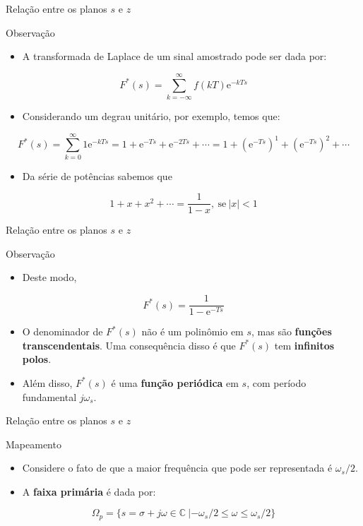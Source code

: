 \begin{frame}{Relação entre os planos $s$ e $z$}
\begin{block}{Observação}
\begin{itemize}
		\item A transformada de Laplace de um sinal amostrado pode ser dada por:
\end{itemize}
$$F^*(s) = \sum_{k=-\infty}^{\infty} f(kT) \text{e}^{-kTs}$$
\begin{itemize}
		\item Considerando um degrau unitário, por exemplo, temos que:
\end{itemize}
$$F^*(s) = \sum_{k=0}^{\infty} 1 \text{e}^{-kTs} = 1 + \text{e}^{-Ts} + \text{e}^{-2Ts} + \cdots = 1 + (\text{e}^{-Ts})^1 + (\text{e}^{-Ts})^2 + \cdots$$
\begin{itemize}
		\item Da série de potências sabemos que
\end{itemize}
$$1 + x + x^2 + \cdots = \dfrac{1}{1-x}, \ \text{se} \ |x| < 1$$
\end{block}
\end{frame}

\begin{frame}{Relação entre os planos $s$ e $z$}
\begin{block}{Observação}
\begin{itemize}
		\item Deste modo,
\end{itemize}
$$F^*(s) = \dfrac{1}{1 - \text{e}^{-Ts}}$$
\begin{itemize}
		\item O denominador de $F^*(s)$ não é um polinômio em $s$, mas são \textbf{funções transcendentais}. Uma consequência disso é que $F^*(s)$ tem \textbf{infinitos polos}.
		\item Além disso, $F^*(s)$ é uma \textbf{função periódica} em $s$, com período fundamental $j\omega_s$.
\end{itemize}
\end{block}
\end{frame}

\begin{frame}{Relação entre os planos $s$ e $z$}
\begin{block}{Mapeamento}
\begin{itemize}
	\item Considere o fato de que a maior frequência que pode ser representada é $\omega_s/2$.
	\item A \textbf{faixa primária} é dada por:
\end{itemize}
$$\Omega_p = \{ s = \sigma + j\omega \in \mathbb{C} \ | -\omega_s/2 \leq \omega \leq \omega_s/2 \} $$
\end{block}
\end{frame}

